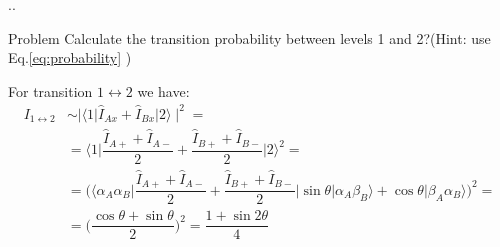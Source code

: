 \documentclass{beamer}
\begin{document}
\begin{frame}{\thesection.\thesubsection. \insertsubsection}
  \begin{block}{Problem}
     Calculate the transition probability between levels 1 and 2?(Hint: use Eq.\ref{eq:probability} )
  \end{block}	    	
  For transition $1 \leftrightarrow 2$ we have:
  \begin{equation}
  \begin{split}
      I_{1 \leftrightarrow 2} &\sim \mid \langle 1 \vert \hat{I}_{Ax} + \hat{I}_{Bx} \vert 2 \rangle  \mid^2 = \\
      &= \langle 1 \vert \dfrac{\hat{I}_{A+} + \hat{I}_{A-}}{2}  + \dfrac{\hat{I}_{B+} + \hat{I}_{B-}}{2}   \vert 2 \rangle ^2 =\\
      &= \Big( \langle \alpha_A  \alpha_B  \vert \dfrac{\hat{I}_{A+} + \hat{I}_{A-}}{2}  + \dfrac{\hat{I}_{B+} + \hat{I}_{B-}}{2}   \vert  \sin \theta \vert \alpha_A \beta_B  \rangle + \cos \theta \vert  \beta_A \alpha_B  \rangle  \Big) ^2 =\\
      &= \Big( \dfrac{\cos \theta + \sin \theta}{2}    \Big)^2 = \dfrac{1 + \sin 2\theta}{4}
  \end{split}
  \end{equation}
\end{frame}
\end{document}

